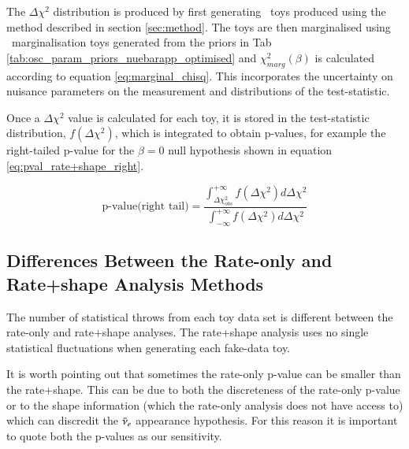 The $\Delta \chi^2$ distribution is produced by first generating \NToysFakeDataRatePlusShape\ toys produced using the method described in section \ref{sec:method}. The toys are then marginalised using \NToysMarg\ marginalisation toys generated from the priors in Tab \ref{tab:osc_param_priors_nuebarapp_optimised} and $\chi^2_{marg} \left( \beta \right)$ is calculated according to equation \ref{eq:marginal_chisq}. This incorporates the uncertainty on nuisance parameters on the measurement and distributions of the test-statistic.

Once a $\Delta \chi^2$ value is calculated for each toy, it is stored in the test-statistic distribution, $f \left( \Delta \chi^2 \right)$, which is integrated to obtain p-values, for example the right-tailed p-value for the $\beta = 0$ null hypothesis shown in equation \ref{eq:pval_rate+shape_right}. %


\begin{equation} \label{eq:pval_rate+shape_right}
\textrm{p-value} \textrm{(right tail)} = 
\frac{\int_{\Delta \chi^2_{obs}}^{+\infty} f \left( \Delta \chi^2 \right) d\Delta \chi^2}{\int_{-\infty}^{+\infty} f \left( \Delta \chi^2 \right) d\Delta \chi^2}
\end{equation}


{\color{red}
	\subsection{Differences Between the Rate-only and Rate+shape Analysis Methods}
} %

The number of statistical throws from each toy data set is different between the rate-only and rate+shape analyses. The rate+shape analysis {\color{red} uses no single statistical fluctuations when} generating each fake-data toy. %

It is worth pointing out that sometimes the rate-only p-value can be smaller than the rate+shape. This can be due to both the discreteness of the rate-only p-value or to the shape information (which the rate-only analysis does not have access to) which can discredit the $\bar{\nu}_{e}$ appearance hypothesis. For this reason it is important to quote both the p-values as our sensitivity.\\


